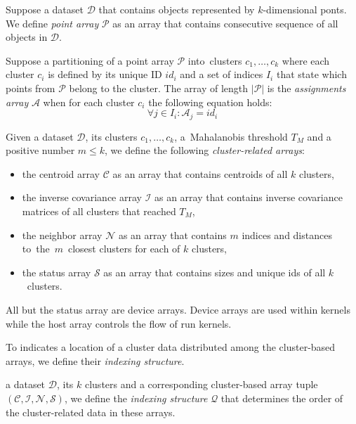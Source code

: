 \begin{defn}
	Suppose a dataset $\mathcal{D}$ that contains objects represented by $k$-di\-men\-si\-onal ponts. We define \emph{point array} $\mathcal{P}$ as an array that contains consecutive sequence of all objects in $\mathcal{D}$.
	\label{def03:point}
\end{defn}

\begin{defn}
	Suppose a partitioning of a point array $\mathcal{P}$ into~clusters $c_1,\dots,c_k$ where each cluster $c_i$ is defined by its unique ID $id_i$ and a set of indices $I_i$ that state which points from $\mathcal{P}$ belong to the cluster. The array of length $|\mathcal{P}|$ is the \emph{assignments array} $\mathcal{A}$ when for each cluster $c_i$ the following equation holds:
	$${\forall j \in I_i : \mathcal{A}_j = id_i}$$
	\label{def03:assign}
\end{defn}

\begin{defn}
	Given a dataset $\mathcal{D}$, its clusters $c_1,\dots,c_k$, a~Mahalanobis threshold $T_M$ and a positive number $m \le k$, we define the following \emph{cluster-related arrays}:
	\begin{itemize}
		\item the centroid array $\mathcal{C}$ as an array that contains centroids of all $k$ clusters,
		\item the inverse covariance array $\mathcal{I}$ as an array that contains inverse covariance matrices of all clusters that reached $T_M$,
		\item the neighbor array $\mathcal{N}$ as an array that contains $m$ indices and distances to~the~$m$~closest clusters for each of $k$ clusters,
		\item the status array $\mathcal{S}$ as an array that contains sizes and unique ids of all $k$~clusters.
	\end{itemize}
	\label{def03:tuple}
\end{defn}


All but the status array are device arrays. Device arrays are used within kernels while the host array controls the flow of run kernels.  

To indicates a location of a cluster data distributed among the cluster-based arrays, we define their \emph{indexing structure}.

\begin{defn}
	 a dataset $\mathcal{D}$, its $k$ clusters and a corresponding cluster-based array tuple $(\mathcal{C},\mathcal{I},\mathcal{N},\mathcal{S})$, we define the \emph{indexing structure} $\mathcal{Q}$ that determines the order of the cluster-related data in these arrays.
	\label{def03:index}
\end{defn}

